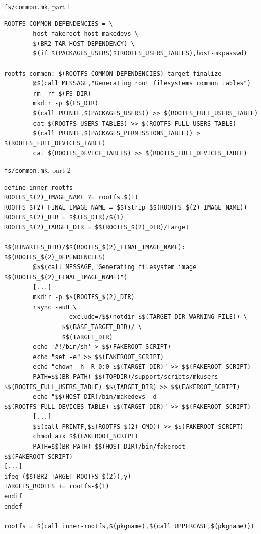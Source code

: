 \begin{frame}[fragile]{{\tt fs/common.mk}, part 1}
  \begin{block}{}
\begin{verbatim}
ROOTFS_COMMON_DEPENDENCIES = \
        host-fakeroot host-makedevs \
        $(BR2_TAR_HOST_DEPENDENCY) \
        $(if $(PACKAGES_USERS)$(ROOTFS_USERS_TABLES),host-mkpasswd)

rootfs-common: $(ROOTFS_COMMON_DEPENDENCIES) target-finalize
        @$(call MESSAGE,"Generating root filesystems common tables")
        rm -rf $(FS_DIR)
        mkdir -p $(FS_DIR)
        $(call PRINTF,$(PACKAGES_USERS)) >> $(ROOTFS_FULL_USERS_TABLE)
        cat $(ROOTFS_USERS_TABLES) >> $(ROOTFS_FULL_USERS_TABLE)
        $(call PRINTF,$(PACKAGES_PERMISSIONS_TABLE)) > $(ROOTFS_FULL_DEVICES_TABLE)
        cat $(ROOTFS_DEVICE_TABLES) >> $(ROOTFS_FULL_DEVICES_TABLE)
\end{verbatim}
  \end{block}
\end{frame}

\begin{frame}[fragile]{{\tt fs/common.mk}, part 2}
  \begin{block}{}
\begin{verbatim}
define inner-rootfs
ROOTFS_$(2)_IMAGE_NAME ?= rootfs.$(1)
ROOTFS_$(2)_FINAL_IMAGE_NAME = $$(strip $$(ROOTFS_$(2)_IMAGE_NAME))
ROOTFS_$(2)_DIR = $$(FS_DIR)/$(1)
ROOTFS_$(2)_TARGET_DIR = $$(ROOTFS_$(2)_DIR)/target

$$(BINARIES_DIR)/$$(ROOTFS_$(2)_FINAL_IMAGE_NAME): $$(ROOTFS_$(2)_DEPENDENCIES)
        @$$(call MESSAGE,"Generating filesystem image $$(ROOTFS_$(2)_FINAL_IMAGE_NAME)")
        [...]
        mkdir -p $$(ROOTFS_$(2)_DIR)
        rsync -auH \
                --exclude=/$$(notdir $$(TARGET_DIR_WARNING_FILE)) \
                $$(BASE_TARGET_DIR)/ \
                $$(TARGET_DIR)
        echo '#!/bin/sh' > $$(FAKEROOT_SCRIPT)
        echo "set -e" >> $$(FAKEROOT_SCRIPT)
        echo "chown -h -R 0:0 $$(TARGET_DIR)" >> $$(FAKEROOT_SCRIPT)
        PATH=$$(BR_PATH) $$(TOPDIR)/support/scripts/mkusers $$(ROOTFS_FULL_USERS_TABLE) $$(TARGET_DIR) >> $$(FAKEROOT_SCRIPT)
        echo "$$(HOST_DIR)/bin/makedevs -d $$(ROOTFS_FULL_DEVICES_TABLE) $$(TARGET_DIR)" >> $$(FAKEROOT_SCRIPT)
        [...]
        $$(call PRINTF,$$(ROOTFS_$(2)_CMD)) >> $$(FAKEROOT_SCRIPT)
        chmod a+x $$(FAKEROOT_SCRIPT)
        PATH=$$(BR_PATH) $$(HOST_DIR)/bin/fakeroot -- $$(FAKEROOT_SCRIPT)
[...]
ifeq ($$(BR2_TARGET_ROOTFS_$(2)),y)
TARGETS_ROOTFS += rootfs-$(1)
endif
endef

rootfs = $(call inner-rootfs,$(pkgname),$(call UPPERCASE,$(pkgname)))
    \end{verbatim}
  \end{block}
\end{frame}

